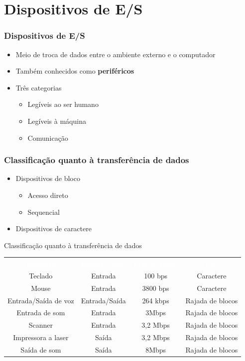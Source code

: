 \documentclass[aspectratio=169,
				xcolor=table]{beamer}
\begin{document}
	
	\section{Dispositivos de E/S}
	
	\begin{frame}
		\frametitle{Dispositivos de E/S}
		\begin{itemize}
			\item Meio de troca de dados entre o ambiente externo e o computador
			\vspace{1em}
			\item Também conhecidos como \textbf{periféricos}
			\vspace{1em}
			\item Três categorias
			\begin{itemize}
				\item Legíveis ao ser humano
				\item Legíveis à máquina
				\item Comunicação
			\end{itemize}
		\end{itemize}
	\end{frame}
	
	\begin{frame}
		\frametitle{Classificação quanto à transferência de dados}
		\begin{itemize}
			\item Dispositivos de bloco
			\begin{itemize}
				\item Acesso direto 
				\item Sequencial
			\end{itemize}
			\vspace{1em}
			\item Dispositivos de caractere
		\end{itemize}
	\end{frame}
	
	\begin{frame}{Classificação quanto à transferência de dados}
	\begin{eftable}
		\begin{tabular}{|c|c|c|c|}
		\textcolor{white}{Dispositivo} & 
		\textcolor{white}{Entrada/Saída} & 
		\textcolor{white}{Taxa de Dados} & 
		\textcolor{white}{Tipo} \\
		Teclado & Entrada & 100 bps & Caractere \\ 
		Mouse & Entrada & 3800 bps & Caractere \\	 
		Entrada/Saída de voz & Entrada/Saída & 264 kbps & Rajada de blocos	 \\ 
		Entrada de som & Entrada & 3Mbps & Rajada de blocos \\ 
		Scanner & Entrada & 3,2 Mbps & Rajada de blocos \\ 
		Impressora a laser & Saída & 3,2 Mbps & Rajada de blocos \\ 
		Saída de som & Saída & 8Mbps & Rajada de blocos \\ 
		\end{tabular} 	
	\end{eftable}

	\end{frame}
\end{document}
